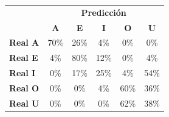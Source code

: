 \begin{tabular}{lccccc}
\toprule
 & \multicolumn{5}{c}{\textbf{Predicción}} \\
 & \textbf{A} & \textbf{E} & \textbf{I} & \textbf{O} & \textbf{U} \\
\midrule
\textbf{Real A} & \cellcolor[rgb]{0.51,0.51,1.00} \color{white} 70\% & \cellcolor[rgb]{0.82,0.82,1.00}  26\% & \cellcolor[rgb]{0.97,0.97,1.00}  4\% & \cellcolor[rgb]{1.00,1.00,1.00}  0\% & \cellcolor[rgb]{1.00,1.00,1.00}  0\% \\
\textbf{Real E} & \cellcolor[rgb]{0.97,0.97,1.00}  4\% & \cellcolor[rgb]{0.44,0.44,1.00} \color{white} 80\% & \cellcolor[rgb]{0.92,0.92,1.00}  12\% & \cellcolor[rgb]{1.00,1.00,1.00}  0\% & \cellcolor[rgb]{0.97,0.97,1.00}  4\% \\
\textbf{Real I} & \cellcolor[rgb]{1.00,1.00,1.00}  0\% & \cellcolor[rgb]{0.88,0.88,1.00}  17\% & \cellcolor[rgb]{0.82,0.82,1.00}  25\% & \cellcolor[rgb]{0.97,0.97,1.00}  4\% & \cellcolor[rgb]{0.62,0.62,1.00} \color{white} 54\% \\
\textbf{Real O} & \cellcolor[rgb]{1.00,1.00,1.00}  0\% & \cellcolor[rgb]{1.00,1.00,1.00}  0\% & \cellcolor[rgb]{0.97,0.97,1.00}  4\% & \cellcolor[rgb]{0.58,0.58,1.00} \color{white} 60\% & \cellcolor[rgb]{0.75,0.75,1.00}  36\% \\
\textbf{Real U} & \cellcolor[rgb]{1.00,1.00,1.00}  0\% & \cellcolor[rgb]{1.00,1.00,1.00}  0\% & \cellcolor[rgb]{1.00,1.00,1.00}  0\% & \cellcolor[rgb]{0.56,0.56,1.00} \color{white} 62\% & \cellcolor[rgb]{0.74,0.74,1.00}  38\% \\
\bottomrule
\end{tabular}